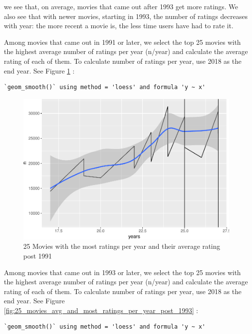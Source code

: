 \documentclass[
]{article}
\begin{document}
we see that, on average, movies that came out after 1993 get more
ratings. We also see that with newer movies, starting in 1993, the
number of ratings decreases with year: the more recent a movie is, the
less time users have had to rate it.

\newpage

Among movies that came out in 1991 or later, we select the top 25 movies
with the highest average number of ratings per year (n/year) and
calculate the average rating of each of them. To calculate number of
ratings per year, use 2018 as the end year. See Figure
\ref{fig:25_movies_avg_and_most_ratings_per_year_post_1991} :

\begin{verbatim}
`geom_smooth()` using method = 'loess' and formula 'y ~ x'
\end{verbatim}

\begin{figure}
\centering
\includegraphics{figures/md_2-1.pdf}
\caption{25 Movies with the most ratings per year and their average
rating post
1991\label{fig:25_movies_avg_and_most_ratings_per_year_post_1991}}
\end{figure}

\newpage

Among movies that came out in 1993 or later, we select the top 25 movies
with the highest average number of ratings per year (n/year) and
calculate the average rating of each of them. To calculate number of
ratings per year, use 2018 as the end year. See Figure
\ref{fig:25_movies_avg_and_most_ratings_per_year_post_1993} :

\begin{verbatim}
`geom_smooth()` using method = 'loess' and formula 'y ~ x'
\end{verbatim}
\end{document}
